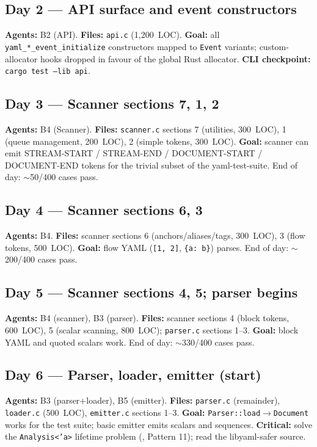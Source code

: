 \documentclass[12pt]{article}
\theoremstyle{definition}
\theoremstyle{remark}
\begin{document}
\subsection*{Day 2 --- API surface and event constructors}
\textbf{Agents:} B2 (API).
\textbf{Files:} \texttt{api.c} (1{,}200~LOC).
\textbf{Goal:} all \texttt{yaml\_*\_event\_initialize} constructors
mapped to \texttt{Event} variants; custom-allocator hooks dropped in
favour of the global Rust allocator.
\textbf{CLI checkpoint:} \texttt{cargo test --lib api}.

\subsection*{Day 3 --- Scanner sections 7, 1, 2}
\textbf{Agents:} B4 (Scanner).
\textbf{Files:} \texttt{scanner.c} sections 7 (utilities, 300~LOC),
1 (queue management, 200~LOC), 2 (simple tokens, 300~LOC).
\textbf{Goal:} scanner can emit STREAM-START / STREAM-END /
DOCUMENT-START / DOCUMENT-END tokens for the trivial subset of the
yaml-test-suite. End of day: $\sim$50/400 cases pass.

\subsection*{Day 4 --- Scanner sections 6, 3}
\textbf{Agents:} B4.
\textbf{Files:} scanner sections 6 (anchors/aliases/tags, 300~LOC),
3 (flow tokens, 500~LOC).
\textbf{Goal:} flow YAML (\texttt{[1, 2]}, \texttt{\{a: b\}}) parses.
End of day: $\sim$200/400 cases pass.

\subsection*{Day 5 --- Scanner sections 4, 5; parser begins}
\textbf{Agents:} B4 (scanner), B3 (parser).
\textbf{Files:} scanner sections 4 (block tokens, 600~LOC),
5 (scalar scanning, 800~LOC); \texttt{parser.c} sections 1--3.
\textbf{Goal:} block YAML and quoted scalars work. End of day:
$\sim$330/400 cases pass.

\subsection*{Day 6 --- Parser, loader, emitter (start)}
\textbf{Agents:} B3 (parser+loader), B5 (emitter).
\textbf{Files:} \texttt{parser.c} (remainder), \texttt{loader.c}
(500~LOC), \texttt{emitter.c} sections 1--3.
\textbf{Goal:} \texttt{Parser::load}$\to$\texttt{Document} works for
the test suite; basic emitter emits scalars and sequences.
\textbf{Critical:} solve the \texttt{Analysis<'a>} lifetime problem
(, Pattern 11); read the libyaml-safer source.
\end{document}
